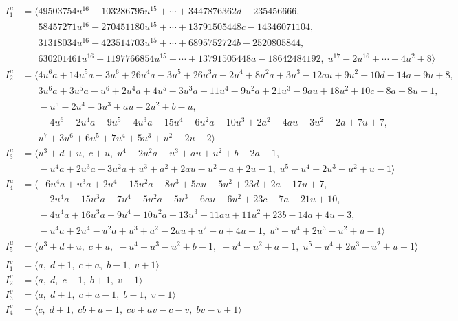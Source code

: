 \documentclass[1p]{elsarticle_modified}
\theoremstyle{definition}
\begin{document}
\begin{align*}
I^u_{1}&=\langle 
49503754 u^{16}-103286795 u^{15}+\cdots+3447876362 d-235456666,\\
\phantom{I^u_{1}}&\phantom{= \langle  }58457271 u^{16}-270451180 u^{15}+\cdots+13791505448 c-14346071104,\\
\phantom{I^u_{1}}&\phantom{= \langle  }31318034 u^{16}-423514703 u^{15}+\cdots+6895752724 b-2520805844,\\
\phantom{I^u_{1}}&\phantom{= \langle  }630201461 u^{16}-1197766854 u^{15}+\cdots+13791505448 a-18642484192,\;u^{17}-2 u^{16}+\cdots-4 u^2+8\rangle \\
I^u_{2}&=\langle 
4 u^6 a+14 u^5 a-3 u^6+26 u^4 a-3 u^5+26 u^3 a-2 u^4+8 u^2 a+3 u^3-12 a u+9 u^2+10 d-14 a+9 u+8,\\
\phantom{I^u_{2}}&\phantom{= \langle  }3 u^6 a+3 u^5 a- u^6+2 u^4 a+4 u^5-3 u^3 a+11 u^4-9 u^2 a+21 u^3-9 a u+18 u^2+10 c-8 a+8 u+1,\\
\phantom{I^u_{2}}&\phantom{= \langle  }- u^5-2 u^4-3 u^3+a u-2 u^2+b- u,\\
\phantom{I^u_{2}}&\phantom{= \langle  }-4 u^6-2 u^4 a-9 u^5-4 u^3 a-15 u^4-6 u^2 a-10 u^3+2 a^2-4 a u-3 u^2-2 a+7 u+7,\\
\phantom{I^u_{2}}&\phantom{= \langle  }u^7+3 u^6+6 u^5+7 u^4+5 u^3+u^2-2 u-2\rangle \\
I^u_{3}&=\langle 
u^3+d+u,\;c+u,\;u^4-2 u^2 a- u^3+a u+u^2+b-2 a-1,\\
\phantom{I^u_{3}}&\phantom{= \langle  }- u^4 a+2 u^3 a-3 u^2 a+u^3+a^2+2 a u- u^2- a+2 u-1,\;u^5- u^4+2 u^3- u^2+u-1\rangle \\
I^u_{4}&=\langle 
-6 u^4 a+u^3 a+2 u^4-15 u^2 a-8 u^3+5 a u+5 u^2+23 d+2 a-17 u+7,\\
\phantom{I^u_{4}}&\phantom{= \langle  }-2 u^4 a-15 u^3 a-7 u^4-5 u^2 a+5 u^3-6 a u-6 u^2+23 c-7 a-21 u+10,\\
\phantom{I^u_{4}}&\phantom{= \langle  }-4 u^4 a+16 u^3 a+9 u^4-10 u^2 a-13 u^3+11 a u+11 u^2+23 b-14 a+4 u-3,\\
\phantom{I^u_{4}}&\phantom{= \langle  }- u^4 a+2 u^4- u^2 a+u^3+a^2-2 a u+u^2- a+4 u+1,\;u^5- u^4+2 u^3- u^2+u-1\rangle \\
I^u_{5}&=\langle 
u^3+d+u,\;c+u,\;- u^4+u^3- u^2+b-1,\;- u^4- u^2+a-1,\;u^5- u^4+2 u^3- u^2+u-1\rangle \\
\\
I^v_{1}&=\langle 
a,\;d+1,\;c+a,\;b-1,\;v+1\rangle \\
I^v_{2}&=\langle 
a,\;d,\;c-1,\;b+1,\;v-1\rangle \\
I^v_{3}&=\langle 
a,\;d+1,\;c+a-1,\;b-1,\;v-1\rangle \\
I^v_{4}&=\langle 
c,\;d+1,\;c b+a-1,\;c v+a v- c- v,\;b v- v+1\rangle \\
\end{align*}
\end{document}
